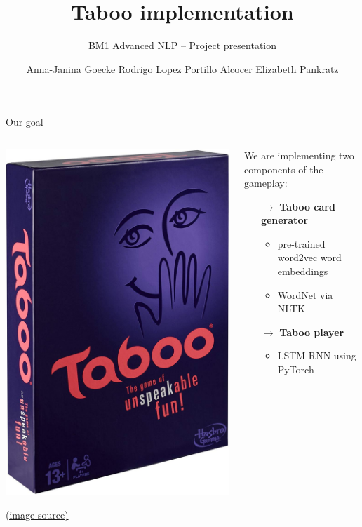\documentclass[11pt]{beamer}
\title{Taboo implementation}
\subtitle{BM1 Advanced NLP -- Project presentation}
\date{}
\author{Anna-Janina Goecke \newline Rodrigo Lopez Portillo Alcocer \newline Elizabeth Pankratz \newline}
\institute{Winter semester 2019/2020 \newline Universität Potsdam}
\begin{document}
	
\maketitle


\begin{frame}{Our goal}

\begin{columns}

\begin{column}{0.5\textwidth}

	\begin{center}
		\includegraphics[width=.6\linewidth]{taboo.jpg}
	\end{center}
		
	\vfill 
	{\tiny \href{https://www.amazon.com/Hasbro-A4626-Taboo-Board-Game/dp/B00D4NJSBW}{(image source)} }

\end{column}

\begin{column}{0.5\textwidth}

	We are implementing two components of the gameplay:
	
	\begin{itemize}
		\item[$\rightarrow$] \textbf{Taboo card generator}
		\begin{itemize}
			\item pre-trained word2vec word embeddings
			\item WordNet via NLTK
		\end{itemize}
		\item[$\rightarrow$] \textbf{Taboo player}
		\begin{itemize}
			\item LSTM RNN using PyTorch
		\end{itemize}
	\end{itemize}


\end{column}
\end{columns}
\end{frame}
\end{document}
